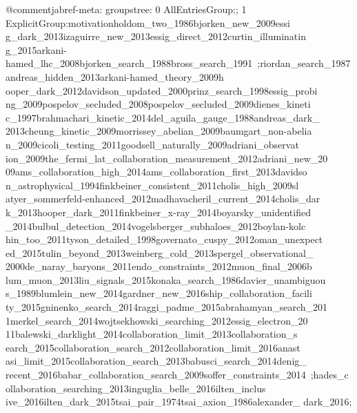 @comment{jabref-meta: groupstree:
0 AllEntriesGroup:;
1 ExplicitGroup:motivation\;holdom_two_1986\;bjorken_new_2009\;essi
g_dark_2013\;izaguirre_new_2013\;essig_direct_2012\;curtin_illuminatin
g_2015\;arkani-hamed_lhc_2008\;bjorken_search_1988\;bross_search_1991\
;riordan_search_1987\;andreas_hidden_2013\;arkani-hamed_theory_2009\;h
ooper_dark_2012\;davidson_updated_2000\;prinz_search_1998\;essig_probi
ng_2009\;pospelov_secluded_2008\;pospelov_secluded_2009\;dienes_kineti
c_1997\;brahmachari_kinetic_2014\;del_aguila_gauge_1988\;andreas_dark_
2013\;cheung_kinetic_2009\;morrissey_abelian_2009\;baumgart_non-abelia
n_2009\;cicoli_testing_2011\;goodsell_naturally_2009\;adriani_observat
ion_2009\;the_fermi_lat_collaboration_measurement_2012\;adriani_new_20
09\;ams_collaboration_high_2014\;ams_collaboration_first_2013\;davidso
n_astrophysical_1994\;finkbeiner_consistent_2011\;cholis_high_2009\;sl
atyer_sommerfeld-enhanced_2012\;madhavacheril_current_2014\;cholis_dar
k_2013\;hooper_dark_2011\;finkbeiner_x-ray_2014\;boyarsky_unidentified
_2014\;bulbul_detection_2014\;vogelsberger_subhaloes_2012\;boylan-kolc
hin_too_2011\;tyson_detailed_1998\;governato_cuspy_2012\;oman_unexpect
ed_2015\;tulin_beyond_2013\;weinberg_cold_2013\;spergel_observational_
2000\;de_naray_baryons_2011\;endo_constraints_2012\;muon_final_2006\;b
lum_muon_2013\;liu_signals_2015\;konaka_search_1986\;davier_unambiguou
s_1989\;blumlein_new_2014\;gardner_new_2016\;ship_collaboration_facili
ty_2015\;gninenko_search_2014\;raggi_padme_2015\;abrahamyan_search_201
1\;merkel_search_2014\;wojtsekhowski_searching_2012\;essig_electron_20
11\;balewski_darklight_2014\;collaboration_limit_2013\;collaboration_s
earch_2015\;collaboration_search_2012\;collaboration_limit_2016\;anast
asi_limit_2015\;collaboration_search_2013\;babusci_search_2014\;denig_
recent_2016\;babar_collaboration_search_2009\;soffer_constraints_2014\
;hades_collaboration_searching_2013\;inguglia_belle_2016\;ilten_inclus
ive_2016\;ilten_dark_2015\;tsai_pair_1974\;tsai_axion_1986\;alexander_
dark_2016\;;
}
